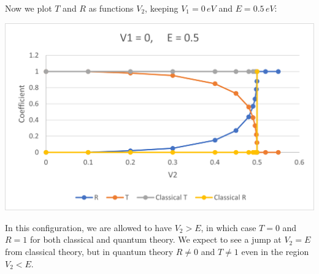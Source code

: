 \documentclass[11pt]{book}
\theoremstyle{break}
\theoremstyle{break}
\begin{document}
Now we plot $T$ and $R$ as functions $V_2$, keeping $V_1=0\, eV$ and $E=0.5\, eV$:
\begin{center}
\includegraphics[scale=1.19]{TR2}
\end{center}
In this configuration, we are allowed to have $V_2>E$, in which case $T=0$ and $R=1$ for both classical and quantum theory. We expect to see a jump at $V_2 = E$ from classical theory, but in quantum theory $R\neq 0$ and $T\neq 1$ even in the region $V_2<E$.\\
\end{document}
